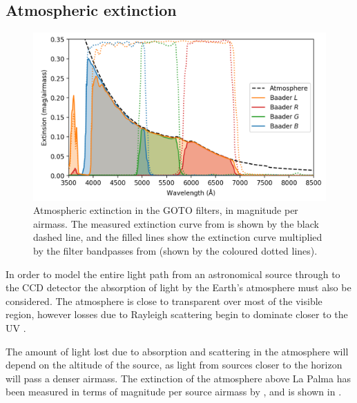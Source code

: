 \begin{colsection}
\begin{colsection}
\end{colsection}

\newpage
\subsection{Atmospheric extinction}
\label{sec:atmosphere}
\begin{colsection}

\begin{figure}[t]
    \begin{center}
        \includegraphics[width=\textwidth]{images/throughput/ext2.png}
    \end{center}
    \caption[Atmospheric extinction in the GOTO filters]{
        Atmospheric extinction in the GOTO filters, in magnitude per airmass. The measured extinction curve from \citet{tn31} is shown by the black dashed line, and the filled lines show the extinction curve multiplied by the filter bandpasses from  (shown by the coloured dotted lines).
    }\label{fig:extinction}
\end{figure}

In order to model the entire light path from an astronomical source through to the CCD detector the absorption of light by the Earth's atmosphere must also be considered. The atmosphere is close to transparent over most of the visible region, however losses due to Rayleigh scattering begin to dominate closer to the UV \citep{atmosphere}.

The amount of light lost due to absorption and scattering in the atmosphere will depend on the altitude of the source, as light from sources closer to the horizon will pass a denser airmass. The extinction of the atmosphere above La Palma has been measured in terms of magnitude per source airmass by \citet{tn31}, and is shown in .


\end{colsection}
\end{colsection}

